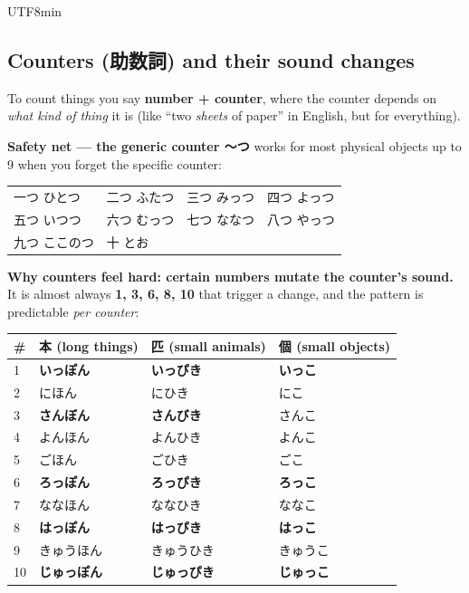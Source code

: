 \documentclass[11pt]{article}
\begin{document}
\begin{CJK}{UTF8}{min}
\subsection{Counters (\texorpdfstring{助数詞}{josūshi}) and their sound changes}
To count things you say \textbf{number + counter}, where the counter depends on
\emph{what kind of thing} it is (like ``two \emph{sheets} of paper'' in English,
but for everything).

\textbf{Safety net --- the generic counter \texorpdfstring{〜つ}{-tsu}} works for
most physical objects up to 9 when you forget the specific counter:
\begin{center}
\begin{tabular}{@{}llll@{}}
\toprule
一つ ひとつ & 二つ ふたつ & 三つ みっつ & 四つ よっつ \\
五つ いつつ & 六つ むっつ & 七つ ななつ & 八つ やっつ \\
九つ ここのつ & 十 とお & & \\
\bottomrule
\end{tabular}
\end{center}

\textbf{Why counters feel hard: certain numbers mutate the counter's sound.} It
is almost always \textbf{1, 3, 6, 8, 10} that trigger a change, and the pattern
is predictable \emph{per counter}:
\begin{center}
\begin{tabular}{@{}llll@{}}
\toprule
\# & 本 (long things) & 匹 (small animals) & 個 (small objects) \\
\midrule
1  & \textbf{いっぽん} & \textbf{いっぴき} & \textbf{いっこ} \\
2  & にほん           & にひき           & にこ \\
3  & \textbf{さんぼん} & \textbf{さんびき} & さんこ \\
4  & よんほん         & よんひき         & よんこ \\
5  & ごほん           & ごひき           & ごこ \\
6  & \textbf{ろっぽん} & \textbf{ろっぴき} & \textbf{ろっこ} \\
7  & ななほん         & ななひき         & ななこ \\
8  & \textbf{はっぽん} & \textbf{はっぴき} & \textbf{はっこ} \\
9  & きゅうほん       & きゅうひき       & きゅうこ \\
10 & \textbf{じゅっぽん} & \textbf{じゅっぴき} & \textbf{じゅっこ} \\
\bottomrule
\end{tabular}
\end{center}


\end{CJK}
\end{document}
